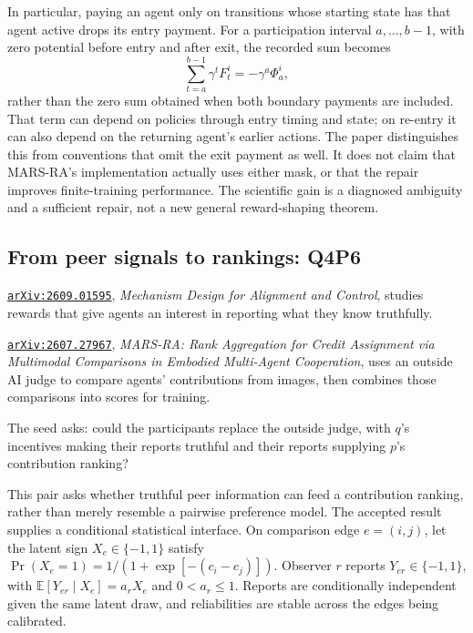 \documentclass[11pt,a4paper]{article}
\renewenvironment{quote}{\tcolorbox[pairpanel]}{\endtcolorbox}
\newcommand{\pl}[1]{\noindent\llap{\makebox[1.5em][l]{\color{accent}\(#1\)}}}
\newcommand{\file}[1]{\texttt{#1}}
\begin{document}
In particular, paying an agent only on transitions whose starting state has that
agent active drops its entry payment. For a participation interval
$a,\ldots,b-1$, with zero potential before entry and after exit, the recorded
sum becomes
\begin{equation}
 \sum_{t=a}^{b-1}\gamma^t F_t^i=-\gamma^a\Phi_a^i,
 \label{eq:pilot-boundary}
\end{equation}
rather than the zero sum obtained when both boundary payments are included. That
term can depend on policies through entry timing and state; on re-entry it can
also depend on the returning agent's earlier actions. The paper distinguishes
this from conventions that omit the exit payment as well. It does not claim that
MARS-RA's implementation actually uses either mask, or that the repair improves
finite-training performance. The scientific gain is a diagnosed ambiguity and a
sufficient repair, not a new general reward-shaping theorem.

\subsection{From peer signals to rankings: Q4P6}

\begin{quote}
\pl{q}\href{https://arxiv.org/abs/2609.01595}{\file{arXiv:2609.01595}},
\emph{Mechanism Design for Alignment and Control}, studies rewards that give
agents an interest in reporting what they know truthfully.

\pl{p}\href{https://arxiv.org/abs/2607.27967}{\file{arXiv:2607.27967}},
\emph{MARS-RA: Rank Aggregation for Credit Assignment via Multimodal Comparisons
in Embodied Multi-Agent Cooperation}, uses an outside AI judge to compare
agents' contributions from images, then combines those comparisons into
scores for training.

The seed asks: could the participants replace the outside judge, with \(q\)'s
incentives making their reports truthful and their reports supplying \(p\)'s
contribution ranking?
\end{quote}

This pair asks whether truthful peer information can feed a contribution
ranking, rather than merely resemble a pairwise preference model. The accepted
result supplies a conditional statistical interface. On comparison edge
$e=(i,j)$, let the latent sign $X_e\in\{-1,1\}$ satisfy
$\Pr(X_e=1)=1/(1+\exp[-(c_i-c_j)])$. Observer $r$ reports $Y_{er}\in\{-1,1\}$,
with $\mathbb E[Y_{er}\mid X_e]=a_rX_e$ and $0<a_r\leq1$. Reports are
conditionally independent given the same latent draw, and reliabilities are
stable across the edges being calibrated.
\end{document}
